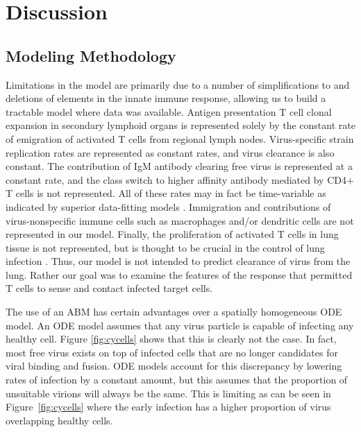 \documentclass[10pt]{article}
\begin{document}
\section*{Discussion}

\subsection*{Modeling Methodology}

Limitations in the model are primarily due to a number of simplifications to and deletions of elements in the innate immune response, allowing us to build a tractable model where data was available.  Antigen presentation T cell clonal expansion in secondary lymphoid organs is represented solely by the constant rate of emigration of activated T cells from regional lymph nodes.  Virus-specific strain replication rates are represented as constant rates, and virus clearance is also constant.  The contribution of IgM antibody clearing free virus is represented at a constant rate, and the class switch to higher affinity antibody mediated by CD4+ T cells is not represented.  All of these rates may in fact be time-variable as indicated by superior data-fitting models \cite{Wu2011}.  Immigration and contributions of virus-nonspecific immune cells such as macrophages and/or dendritic cells are not represented in our model.  Finally, the proliferation of activated T cells in lung tissue is not represented, but is thought to be crucial in the control of lung infection \cite{Miao2010}.  Thus, our model is not intended to predict clearance of virus from the lung.  Rather our goal was to examine the features of the response that permitted T cells to sense and contact infected target cells.

The use of an ABM has certain advantages over a spatially homogeneous ODE model.  An ODE model assumes that any virus particle is capable of infecting any healthy cell.  Figure \ref{fig:cycells} shows that this is clearly not the case.  In fact, most free virus exists on top of infected cells that are no longer candidates for viral binding and fusion.  ODE models account for this discrepancy by lowering rates of infection by a constant amount, but this assumes that the proportion of unsuitable virions will always be the same.  This is limiting as can be seen in Figure~\ref{fig:cycells} where the early infection has a higher proportion of virus overlapping healthy cells.
\end{document}
